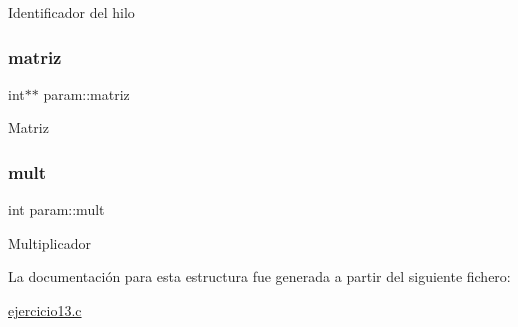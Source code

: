 Identificador del hilo \mbox{\label{structparam_af5ed705ed1a83675011b4e89d35b91a2}} 
\subsubsection{\texorpdfstring{matriz}{matriz}}
{\footnotesize\ttfamily int$\ast$$\ast$ param\+::matriz}

Matriz \mbox{\label{structparam_a6e90bf3ec4545c53ebd617b79b1f5350}} 
\subsubsection{\texorpdfstring{mult}{mult}}
{\footnotesize\ttfamily int param\+::mult}

Multiplicador 

La documentación para esta estructura fue generada a partir del siguiente fichero\+:\begin{DoxyCompactItemize}
\item 
\mbox{\hyperlink{ejercicio13_8c}{ejercicio13.\+c}}\end{DoxyCompactItemize}
